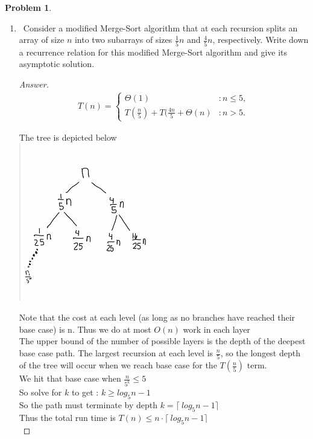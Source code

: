 \documentclass[11pt]{article}
\theoremstyle{definition}
\theoremstyle{definition}
\newtheorem{required}{Problem}
\theoremstyle{definition}
\begin{document}
\begin{required}
\begin{enumerate}[label=(\alph*)]
\begin{proof}[Answer]
\end{proof}
\newpage

\item \label{(b)}~Consider a modified Merge-Sort algorithm that at each recursion splits an array of size $n$  into two subarrays of sizes $\frac{1}{5}n$ and $\frac{4}{5}n$, respectively. Write down a recurrence relation for this modified Merge-Sort algorithm and give its asymptotic solution.


\begin{proof}[Answer]
\begin{align*}
T(n) = \begin{cases}
\Theta(1) & : n \leq 5, \\
T(\frac{n}{5}) + T(\frac{4n}{5} + \Theta(n) & : n > 5.
\end{cases}
\end{align*}

The tree is depicted below \\
\includegraphics[width=0.5\textwidth]{1bHw6}


Note that the cost at each level (as long as no branches have reached their base case) is n. Thus we do at most $O(n)$ work in each layer\\
The upper bound of the number of possible layers is the depth of the deepest base case path. The largest recursion at each level is $\frac{n}{5}$, so the longest depth of the tree will occur when we reach base case for the $T(\frac{n}{5}) $ term. \\
We hit that base case when $ \frac{n}{5^k}\leq5$\\
So solve for $k$ to get : $k\geq log_{5}n -1$\\
So the path must terminate by depth $k = \lceil\ log_{5}n -1 \rceil$ \\
Thus the total run time is $T(n) \leq n \cdot \lceil\ log_{5}n -1 \rceil$ \\



\end{proof}
\end{enumerate}
\end{required}
\end{document}
